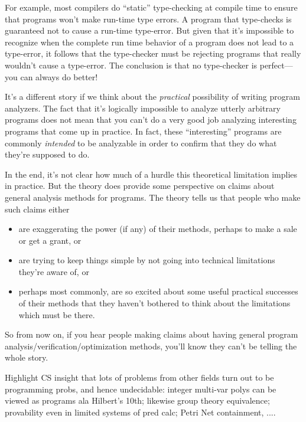 For example, most compilers do ``static'' type-checking at compile
time to ensure that programs won't make run-time type errors.  A
program that type-checks is guaranteed not to cause a run-time
type-error.  But given that it's impossible to recognize when the
complete run time behavior of a program does not lead to a type-error,
it follows that the type-checker must be rejecting programs that
really wouldn't cause a type-error.  The conclusion is that no
type-checker is perfect---you can always do better!

It's a different story if we think about the \emph{practical}
possibility of writing program analyzers.  The fact that it's
logically impossible to analyze utterly arbitrary programs does not
mean that you can't do a very good job analyzing interesting programs
that come up in practice.  In fact, these ``interesting'' programs are
commonly \emph{intended} to be analyzable in order to confirm that
they do what they're supposed to do.

In the end, it's not clear how much of a hurdle this theoretical
limitation implies in practice.  But the theory does provide some
perspective on claims about general analysis methods for programs.
The theory tells us that people who make such claims either
\begin{itemize}
\item are exaggerating the power (if any) of their methods, perhaps to make a
  sale or get a grant, or

\item are trying to keep things simple by not going into technical
  limitations they're aware of, or

\item perhaps most commonly, are so excited about some useful practical
    successes of their methods that they haven't bothered to think about
    the limitations which must be there.
\end{itemize}
So from now on, if you hear people making claims about having general
program analysis/verification/optimization methods, you'll know they
can't be telling the whole story.

\begin{editingnotes}
Highlight CS insight that lots of problems from other fields turn out
to be programming probs, and hence undecidable: integer
multi-var polys can be viewed as programs ala Hilbert's 10th; likewise
group theory equivalence; provability even in limited systems of pred
calc; Petri Net containment, ....
\end{editingnotes}

